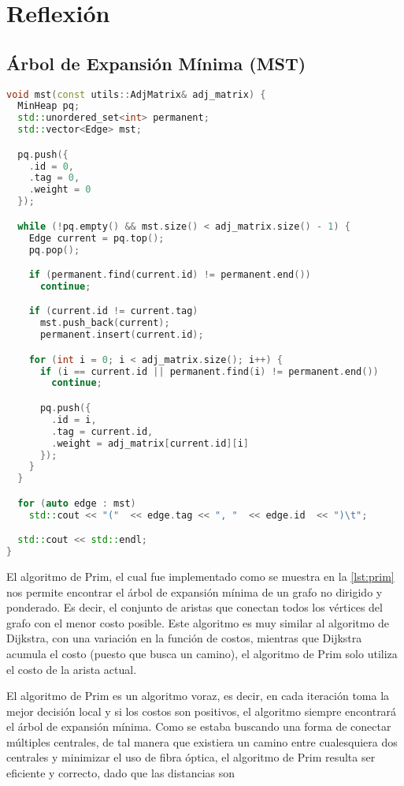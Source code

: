 \documentclass[12pt]{article}
\begin{document}
    \section{Reflexión}
    \subsection{Árbol de Expansión Mínima (MST)}
    \begin{lstlisting}[language=cpp, caption={Algoritmo de Prim}, label={lst:prim}]
void mst(const utils::AdjMatrix& adj_matrix) {
  MinHeap pq;
  std::unordered_set<int> permanent;
  std::vector<Edge> mst;

  pq.push({
    .id = 0,
    .tag = 0,
    .weight = 0
  });

  while (!pq.empty() && mst.size() < adj_matrix.size() - 1) {
    Edge current = pq.top();
    pq.pop();

    if (permanent.find(current.id) != permanent.end())
      continue;

    if (current.id != current.tag)
      mst.push_back(current);
      permanent.insert(current.id);

    for (int i = 0; i < adj_matrix.size(); i++) {
      if (i == current.id || permanent.find(i) != permanent.end())
        continue;

      pq.push({
        .id = i,
        .tag = current.id,
        .weight = adj_matrix[current.id][i]
      });
    }
  }

  for (auto edge : mst)
    std::cout << "("  << edge.tag << ", "  << edge.id  << ")\t";

  std::cout << std::endl;
}
    \end{lstlisting}

    El algoritmo de Prim, el cual fue implementado como se muestra en la \autoref{lst:prim}
    nos permite encontrar el árbol de expansión mínima de un grafo no dirigido y ponderado.
    Es decir, el conjunto de aristas que conectan todos los vértices del grafo con el menor
    costo posible. Este algoritmo es muy similar al algoritmo de Dijkstra, con una variación 
    en la función de costos, mientras que Dijkstra acumula el costo (puesto que busca un camino),
    el algoritmo de Prim solo utiliza el costo de la arista actual.
    
    El algoritmo de Prim es un algoritmo voraz, es decir, en cada iteración toma la mejor decisión
    local y si los costos son positivos, el algoritmo siempre encontrará el árbol de expansión mínima.
    Como se estaba buscando una forma de conectar múltiples centrales, de tal manera que existiera un camino
    entre cualesquiera dos centrales y minimizar el uso de fibra óptica, el algoritmo de Prim resulta ser
    eficiente y correcto, dado que las distancias son
\end{document}
